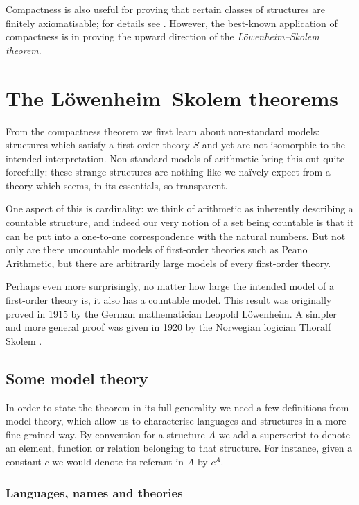 \documentclass[10pt, a4paper, oneside]{article}
\theoremstyle{definition}
\theoremstyle{remark}
\theoremstyle{plain}
\theoremstyle{plain}
\begin{document}
Compactness is also useful for proving that certain classes of structures are
finitely axiomatisable; for details see \citet[pp. 114--116]{vdalen2004}.
However, the best-known application of compactness is in proving the upward
direction of the \emph{Löwenheim--Skolem theorem}.

\section{The Löwenheim--Skolem theorems}

From the compactness theorem we first learn about non-standard models:
structures which satisfy a first-order theory $S$ and yet are not isomorphic to
the intended interpretation. Non-standard models of arithmetic bring this out
quite forcefully: these strange structures are nothing like we naïvely expect
from a theory which seems, in its essentials, so transparent.

One aspect of this is cardinality: we think of arithmetic as inherently
describing a countable structure, and indeed our very notion of a set being
countable is that it can be put into a one-to-one correspondence with the
natural numbers. But not only are there uncountable models of first-order
theories such as Peano Arithmetic, but there are arbitrarily large models of
every first-order theory.

Perhaps even more surprisingly, no matter how large the intended model of a
first-order theory is, it also has a countable model. This result was originally
proved in 1915 by the German mathematician Leopold Löwenheim. A simpler and more
general proof was given in 1920 by the Norwegian logician Thoralf Skolem
\citep{lowenheim1915, skolem1920}.

\subsection{Some model theory}

In order to state the theorem in its full generality we need a few definitions
from model theory, which allow us to characterise languages and structures in a
more fine-grained way. By convention for a structure $A$ we add a superscript to
denote an element, function or relation belonging to that structure. For
instance, given a constant $c$ we would denote its referant in $A$ by $c^A$.

\subsubsection{Languages, names and theories}
\end{document}
